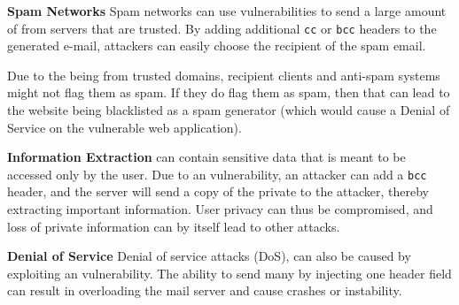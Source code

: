 \noindent\textbf{Spam Networks}
	Spam networks can use \ehi vulnerabilities to send a large amount of \email from servers that are trusted. By adding additional \texttt{cc} or \texttt{bcc} headers to the generated e-mail, attackers can easily choose the recipient of the spam email. 
	
	Due to the \email being from trusted domains, recipient \email clients and anti-spam systems might not flag them as spam. If they do flag them as spam, then that can lead to the website being blacklisted as a spam generator (which would cause a Denial of Service on the vulnerable web application). 
	
\noindent\textbf{Information Extraction}
	\emails can contain sensitive data that is meant to be accessed only by the user. Due to an \ehi vulnerability, an attacker can add a \texttt{bcc} header, and the \email server will send a copy of the private \email to the attacker, thereby extracting important information.
	User privacy can thus be compromised, and loss of private information can by itself lead to other attacks.

    \noindent\textbf{Denial of Service}
    Denial of service attacks (DoS), can also be caused by exploiting an \ehi vulnerability. The ability to send many \emails by injecting one header field can result in overloading the mail server and cause crashes or instability. 


